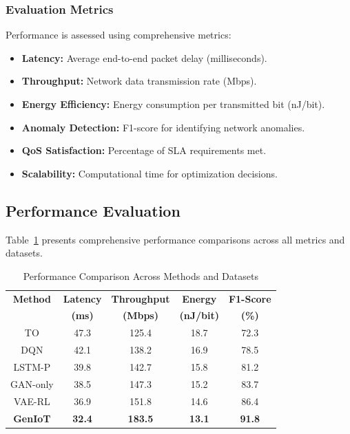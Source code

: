 \documentclass[conference]{IEEEtran}
\begin{document}
\subsubsection{Evaluation Metrics}

Performance is assessed using comprehensive metrics:

\begin{itemize}
\item \textbf{Latency:} Average end-to-end packet delay (milliseconds).
\item \textbf{Throughput:} Network data transmission rate (Mbps).
\item \textbf{Energy Efficiency:} Energy consumption per transmitted bit (nJ/bit).
\item \textbf{Anomaly Detection:} F1-score for identifying network anomalies.
\item \textbf{QoS Satisfaction:} Percentage of SLA requirements met.
\item \textbf{Scalability:} Computational time for optimization decisions.
\end{itemize}

\subsection{Performance Evaluation}

Table~\ref{tab:performance} presents comprehensive performance comparisons across all metrics and datasets.

\begin{table}[htbp]
\caption{Performance Comparison Across Methods and Datasets}
\begin{center}
\begin{tabular}{|c|c|c|c|c|}
\hline
\textbf{Method} & \textbf{Latency} & \textbf{Throughput} & \textbf{Energy} & \textbf{F1-Score} \\
\textbf{} & \textbf{(ms)} & \textbf{(Mbps)} & \textbf{(nJ/bit)} & \textbf{(\%)} \\
\hline
TO & 47.3 & 125.4 & 18.7 & 72.3 \\
\hline
DQN & 42.1 & 138.2 & 16.9 & 78.5 \\
\hline
LSTM-P & 39.8 & 142.7 & 15.8 & 81.2 \\
\hline
GAN-only & 38.5 & 147.3 & 15.2 & 83.7 \\
\hline
VAE-RL & 36.9 & 151.8 & 14.6 & 86.4 \\
\hline
\textbf{GenIoT} & \textbf{32.4} & \textbf{183.5} & \textbf{13.1} & \textbf{91.8} \\
\hline
\end{tabular}
\label{tab:performance}
\end{center}
\end{table}
\end{document}
